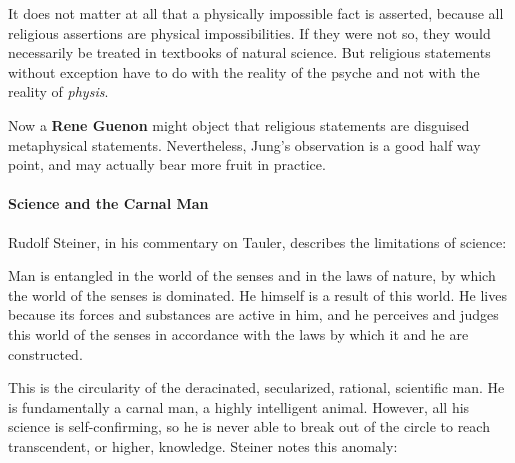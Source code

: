 \begin{quotex}
It does not matter at all that a physically impossible fact is asserted, because all religious assertions are physical impossibilities. If they were not so, they would necessarily be treated in textbooks of natural science. But religious statements without exception have to do with the reality of the psyche and not with the reality of \emph{physis}. 

\end{quotex}
Now a \textbf{Rene Guenon} might object that religious statements are disguised metaphysical statements. Nevertheless, Jung's observation is a good half way point, and may actually bear more fruit in practice.

\paragraph{Science and the Carnal Man}
Rudolf Steiner, in his commentary on Tauler, describes the limitations of science:

\begin{quotex}
Man is entangled in the world of the senses and in the laws of nature, by which the world of the senses is dominated. He himself is a result of this world. He lives because its forces and substances are active in him, and he perceives and judges this world of the senses in accordance with the laws by which it and he are constructed. 

\end{quotex}
This is the circularity of the deracinated, secularized, rational, scientific man. He is fundamentally a carnal man, a highly intelligent animal. However, all his science is self-confirming, so he is never able to break out of the circle to reach transcendent, or higher, knowledge. Steiner notes this anomaly:

